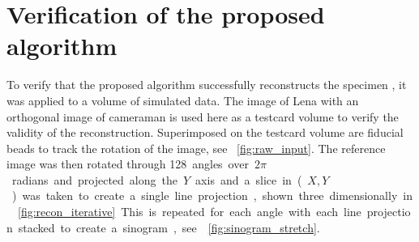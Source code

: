 \documentclass{osa-article}
\begin{document}
\section{Verification of the proposed algorithm}

To verify that the proposed algorithm successfully reconstructs the specimen%
, it was applied to a volume of simulated data. %
The image of Lena with an orthogonal image of cameraman
is used here as a testcard volume to verify the validity of the reconstruction.
Superimposed on the testcard volume are fiducial beads to track the rotation of the image, see \figurename~\ref{fig:raw_input}.
The reference image was then rotated through \SI{128} angles over \(2\pi \) radians and projected along the \(Y\) axis and a slice in (\(X,Y\)) was taken to create a single line projection, shown three dimensionally in \figurename~\ref{fig:recon_iterative}.
This is repeated for each angle with each line projection stacked to create a sinogram, see \figurename~\ref{fig:sinogram_stretch}.

\end{document}
